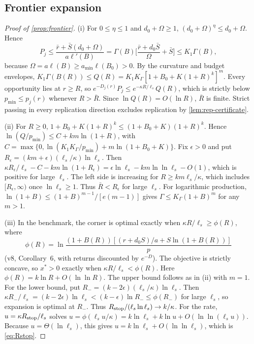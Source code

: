 \documentclass[11pt,a4paper]{article}
\theoremstyle{definition}
\newcommand{\ls}{\ell_s}
\begin{document}
\subsection{Frontier expansion}
\label{app:frontier-proof}
\begin{proof}[Proof of \cref{prop:frontier}]
(i) For $0\leq\eta\leq1$ and $d_0+\Omega\geq1$,
$(d_0+\Omega)^\eta\leq d_0+\Omega$. Hence
\[
 P_j\leq\frac{\bar r+\bar S(d_0+\Omega)}{a\ell'(B)}
 =\Gamma(B)\Big[\frac{\bar r+d_0\bar S}{\Omega}+\bar S\Big]\leq K_1\Gamma(B),
\]
because $\Omega=a\ell(B)\geq a_{\min}\ell(B_0)>0$. By the curvature and budget
envelopes, $K_1\Gamma(B(R))\leq Q(R)=K_1K_\Gamma[1+B_0+K(1+R)^k]^m$. Every
opportunity lies at $r\geq R$, so $e^{-D_j(r)}P_j\leq e^{-\kappa R/\ls}Q(R)$,
which is strictly below $p_{\min}\leq p_j(r)$ whenever $R>\bar R$.
Since $\ln Q(R)=O(\ln R)$, $\bar R$ is finite. Strict passing in every
replication direction excludes replication by \cref{lem:rep-certificate}.

(ii) For $R\geq0$, $1+B_0+K(1+R)^k\leq(1+B_0+K)(1+R)^k$. Hence
$\ln(Q/p_{\min})\leq C+km\ln(1+R)$, with
$C=\max\{0,\ln(K_1K_\Gamma/p_{\min})+m\ln(1+B_0+K)\}$. Fix $\epsilon>0$ and
put $R_\epsilon=(km+\epsilon)(\ls/\kappa)\ln\ls$. Then
$\kappa R_\epsilon/\ls-C-km\ln(1+R_\epsilon)=\epsilon\ln\ls-km\ln\ln\ls-O(1)$,
which is positive for large $\ls$. The left side is increasing for
$R\geq km\ls/\kappa$, which includes $[R_\epsilon,\infty)$ once $\ln\ls\geq1$.
Thus $\bar R<R_\epsilon$ for large $\ls$. For logarithmic production,
$\ln(1+B)\leq(1+B)^{m-1}/[e(m-1)]$ gives $\Gamma\leq K_\Gamma(1+B)^m$ for any
$m>1$.

(iii) In the benchmark, the corner is optimal exactly when
$\kappa R/\ls\geq\phi(R)$, where
\[
 \phi(R)=\ln\frac{(1+B(R))[(r+d_0S)/a+S\ln(1+B(R))]}{p}
\]
(v8, Corollary~6, with returns discounted by $e^{-D}$). The objective is
strictly concave, so $x^*>0$ exactly when $\kappa R/\ls<\phi(R)$. Here
$\phi(R)=k\ln R+O(\ln\ln R)$. The upper bound follows as in (ii) with $m=1$.
For the lower bound, put $R_-=(k-2\epsilon)(\ls/\kappa)\ln\ls$. Then
$\kappa R_-/\ls=(k-2\epsilon)\ln\ls<(k-\epsilon)\ln R_-\leq\phi(R_-)$ for large
$\ls$, so expansion is optimal at $R_-$. Thus
$R_{\rm stop}/(\ls\ln\ls)\to k/\kappa$. For the rate, $u=\kappa R_{\rm stop}/\ls$
solves $u=\phi(\ls u/\kappa)=k\ln\ls+k\ln u+O(\ln\ln(\ls u))$. Because
$u=\Theta(\ln\ls)$, this gives $u=k\ln\ls+O(\ln\ln\ls)$, which is
\cref{eq:Rstop}.
\end{proof}
\end{document}
